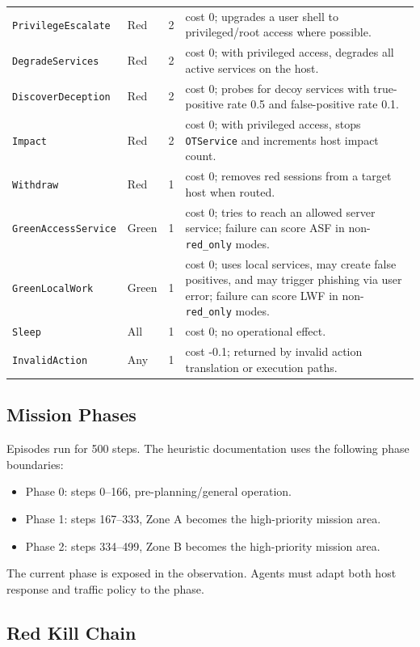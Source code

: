 \begin{longtable}{p{}p{}p{}p{}}
\texttt{PrivilegeEscalate} & Red & 2 & cost 0; upgrades a user shell to privileged/root access where possible. \\
\texttt{DegradeServices} & Red & 2 & cost 0; with privileged access, degrades all active services on the host. \\
\texttt{DiscoverDeception} & Red & 2 & cost 0; probes for decoy services with true-positive rate 0.5 and false-positive rate 0.1. \\
\texttt{Impact} & Red & 2 & cost 0; with privileged access, stops \texttt{OTService} and increments host impact count. \\
\texttt{Withdraw} & Red & 1 & cost 0; removes red sessions from a target host when routed. \\
\texttt{GreenAccessService} & Green & 1 & cost 0; tries to reach an allowed server service; failure can score ASF in non-\texttt{red\_only} modes. \\
\texttt{GreenLocalWork} & Green & 1 & cost 0; uses local services, may create false positives, and may trigger phishing via user error; failure can score LWF in non-\texttt{red\_only} modes. \\
\texttt{Sleep} & All & 1 & cost 0; no operational effect. \\
\texttt{InvalidAction} & Any & 1 & cost -0.1; returned by invalid action translation or execution paths. \\
\bottomrule
\end{longtable}

\subsection{Mission Phases}

Episodes run for 500 steps. The heuristic documentation uses the following phase boundaries:

\begin{itemize}
  \item Phase 0: steps 0--166, pre-planning/general operation.
  \item Phase 1: steps 167--333, Zone A becomes the high-priority mission area.
  \item Phase 2: steps 334--499, Zone B becomes the high-priority mission area.
\end{itemize}

The current phase is exposed in the observation. Agents must adapt both host response and traffic policy to the phase.

\subsection{Red Kill Chain}


